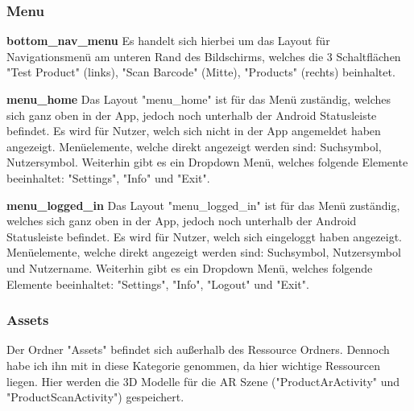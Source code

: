 \documentclass{scrartcl}
\begin{document}
\subsubsection{Menu}

\noindent \textbf{bottom\_nav\_menu \newline}
\noindent Es handelt sich hierbei um das Layout für Navigationsmenü am unteren Rand des Bildschirms, welches die 3 Schaltflächen "Test Product" (links), "Scan Barcode" (Mitte), "Products" (rechts) beinhaltet. \newline 

\noindent \textbf{menu\_home \newline}
\noindent Das Layout "menu\_home" ist für das Menü zuständig, welches sich ganz oben in der App, jedoch noch unterhalb der Android Statusleiste befindet. Es wird für Nutzer, welch sich nicht in der App angemeldet haben angezeigt. Menüelemente, welche direkt angezeigt werden sind: Suchsymbol, Nutzersymbol. Weiterhin gibt es ein Dropdown Menü, welches folgende Elemente beeinhaltet: "Settings", "Info" und "Exit". \newline

\noindent \textbf{menu\_logged\_in \newline}
\noindent Das Layout "menu\_logged\_in" ist für das Menü zuständig, welches sich ganz oben in der App, jedoch noch unterhalb der Android Statusleiste befindet. Es wird für Nutzer, welch sich eingeloggt haben angezeigt. Menüelemente, welche direkt angezeigt werden sind: Suchsymbol, Nutzersymbol und Nutzername. Weiterhin gibt es ein Dropdown Menü, welches folgende Elemente beeinhaltet: "Settings", "Info", "Logout" und "Exit". \newline

\newpage 

\subsubsection{Assets}

Der Ordner "Assets" befindet sich außerhalb des Ressource Ordners. Dennoch habe ich ihn mit in diese Kategorie genommen, da hier wichtige Ressourcen liegen. Hier werden die 3D Modelle für die AR Szene ("ProductArActivity" und "ProductScanActivity") gespeichert. \newline 
\end{document}
